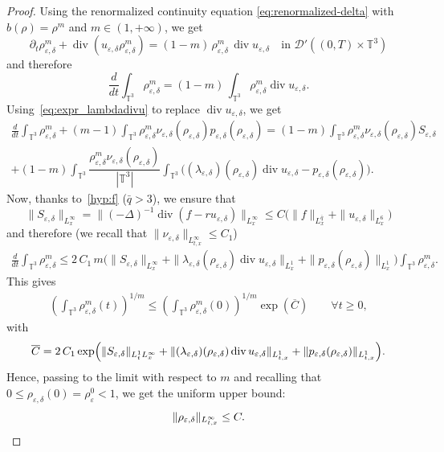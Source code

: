 \documentclass[10pt]{amsart}
\let\mathcal\mathscr
\newcommand{\<}{\bigl\langle}
\renewcommand{\>}{\bigr\rangle}
\theoremstyle{definition}
\theoremstyle{remark}
\newcommand{\TT}{\mathbb{T}^3}
\DeclareMathOperator{\Div}{div}
\let\ep\varepsilon
\begin{document}
\begin{proof}
Using the renormalized continuity equation \eqref{eq:renormalized-delta} with $b(\rho) = \rho^m$ and $m \in (1,+\infty)$, we get
\[
\partial_t \rho_{\ep,\delta}^m + \Div (u_{\ep,\delta} \rho_{\ep,\delta}^m)
= (1-m) \, \rho_{\ep,\delta}^m \, \Div u_{\ep,\delta} \quad \text{in } \mathcal{D}'((0,T)\times \TT)
\]
and therefore
\[
\frac{d}{dt} \int_{\TT} \rho_{\ep,\delta}^m = (1-m)\, \int_{\TT} \rho_{\ep,\delta}^m \Div u_{\ep,\delta}.
\]
Using~\eqref{eq:expr_lambdadivu} to replace $\Div u_{\ep,\delta}$, we get
\begin{multline*}
\frac{d}{dt} \int_{\TT}\rho_{\ep,\delta}^m + (m-1) \int_{\TT} \rho_{\ep,\delta}^m
\nu_{\ep,\delta}(\rho_{\ep,\delta}) p_{\ep,\delta}(\rho_{\ep,\delta})
= (1-m) \int_{\TT} \rho_{\ep,\delta}^m
\nu_{\ep,\delta}(\rho_{\ep,\delta}) S_{\ep,\delta}\\
+ (1-m) \int_{\TT} \dfrac{\rho_{\ep,\delta}^m \nu_{\ep,\delta}(\rho_{\ep,\delta})}{|\TT|} \int_{\TT}{ \big((\lambda_{\ep,\delta})(\rho_{\ep,\delta}) \Div u_{\ep,\delta}
- p_{\ep,\delta}(\rho_{\ep,\delta}) \big) }.
\end{multline*}
Now, thanks to~\eqref{hyp:f} ($\bar{q} > 3$), we ensure that
\[
\|S_{\varepsilon,\delta}\|_{L^\infty_x} = \|(-\Delta)^{-1}\Div (f-ru_{\ep,\delta})\|_{L^\infty_x} \leq C \big(\|f\|_{L^{\bar{q}}_x}+ \|u_{\ep,\delta}\|_{L^6_x} \big)
\]
and therefore (we recall that $\|\nu_{\ep,\delta}\|_{L^\infty_{t,x}} \leq C_1$)
\begin{align*}
\frac{d}{dt} \int_{\TT} \rho_{\varepsilon,\delta}^m
\leq 2 \, C_1 \, m \Big(\|S_{\ep,\delta}\|_{L^\infty_x}
+ \| \lambda_{\ep,\delta}(\rho_{\ep,\delta}) \Div u_{\ep,\delta} \|_{L^1_x}
+ \|p_{\ep,\delta}(\rho_{\ep,\delta})\|_{L^1_x} \Big)
\int_{\TT} \rho_{\ep,\delta}^m.
\end{align*}
This gives
\begin{align*}
\left(\int_{\TT} \rho_{\varepsilon,\delta}^m(t)\right)^{1/m} \leq
\left(\int_{\TT} \rho_{\varepsilon,\delta}^m(0)\right)^{1/m} \exp (\overline C) \qquad \forall t \geq 0,
\end{align*} 
with
\[
\overline{C} = 2\, C_1 \exp\Bigl(\|S_{\ep,\delta}\|_{L^1_t L^\infty_x}
+ \| (\lambda_{\ep,\delta})(\rho_{\ep,\delta}) \Div u_{\ep,\delta} \|_{L^1_{t,x}}
+ \|p_{\ep,\delta}(\rho_{\ep,\delta})\|_{L^1_{t,x}}\Bigr).
\]
Hence, passing to the limit with respect to $m$ and recalling that $0 \leq \rho_{\ep,\delta}(0) = \rho_\ep^0 < 1$, we get the uniform upper bound:
\[
\|\rho_{\ep,\delta}\|_{L^\infty_{t,x}} \leq C.\qedhere
\]
\end{proof}
\end{document}
